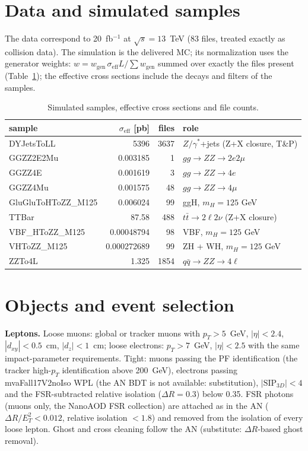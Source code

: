 \documentclass[11pt,a4paper]{article}
\begin{document}
\section{Data and simulated samples}
The data correspond to 20~fb$^{-1}$ at $\sqrt{s}=13$~TeV (83 files, treated exactly as collision data). The simulation is the delivered MC; its normalization uses the generator weights: $w = w_{\text{gen}}\,\sigma_{\text{eff}} L / \sum w_{\text{gen}}$ summed over exactly the files present (Table~\ref{tab:mc}); the effective cross sections include the decays and filters of the samples.
\begin{table}[H]\centering\small\caption{Simulated samples, effective cross sections and file counts.}\label{tab:mc}\begin{tabular}{lrrl}\toprule sample & $\sigma_{\text{eff}}$ [pb] & files & role\\\midrule
DYJetsToLL & 5396 & 3637 & $Z/\gamma^*$+jets (Z+X closure, T\&P)\\
GGZZ2E2Mu & 0.003185 & 1 & $gg\to ZZ\to2e2\mu$\\
GGZZ4E & 0.001619 & 3 & $gg\to ZZ\to4e$\\
GGZZ4Mu & 0.001575 & 48 & $gg\to ZZ\to4\mu$\\
GluGluToHToZZ\_M125 & 0.006024 & 99 & ggH, $m_H=125$ GeV\\
TTBar & 87.58 & 488 & $t\bar t\to2\ell2\nu$ (Z+X closure)\\
VBF\_HToZZ\_M125 & 0.00048794 & 98 & VBF, $m_H=125$ GeV\\
VHToZZ\_M125 & 0.000272689 & 99 & ZH + WH, $m_H=125$ GeV\\
ZZTo4L & 1.325 & 1854 & $q\bar q\to ZZ\to4\ell$\\
\bottomrule\end{tabular}\end{table}
\section{Objects and event selection}
\textbf{Leptons.} Loose muons: global or tracker muons with $p_T>5$~GeV, $|\eta|<2.4$, $|d_{xy}|<0.5$~cm,
$|d_z|<1$~cm; loose electrons: $p_T>7$~GeV, $|\eta|<2.5$ with the same impact-parameter requirements.  Tight: muons
passing the PF identification (the tracker high-$p_T$ identification above 200~GeV), electrons passing
mvaFall17V2noIso WPL (the AN BDT is not available: substitution), $|\mathrm{SIP}_{3D}|<4$ and the FSR-subtracted
relative isolation ($\Delta R=0.3$) below 0.35.  FSR photons (muons only, the NanoAOD FSR collection) are attached as
in the AN ($\Delta R/E_T^2<0.012$, relative isolation $<1.8$) and removed from the isolation of every loose lepton.
Ghost and cross cleaning follow the AN (substitute: $\Delta R$-based ghost removal).
\end{document}
